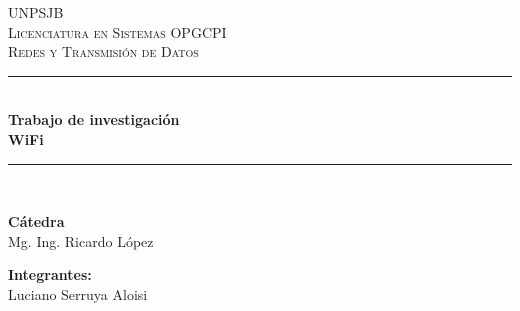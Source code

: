 \begin{titlepage}

    \newcommand{\HRule}{\rule{\linewidth}{0.5mm}} %

    \center %
     

    \textsc{\LARGE UNPSJB}\\[1cm] %
    \textsc{\Large Licenciatura en Sistemas OPGCPI}\\[0.5cm] %
    \textsc{\large Redes y Transmisión de Datos}\\[0.5cm] %


    \HRule \\[0.4cm]
    {\huge \bfseries Trabajo de investigación}\\[0.4cm] %
    {\large \bfseries WiFi}\\[0.4cm] %
    \HRule \\[1.5cm]
     


    \begin{minipage}[l]{0.5\textwidth}
        \begin{flushleft}
            \textbf{\textsf{Cátedra}}\\
            \large Mg. Ing. Ricardo López \\ 
            \linespread{4}
            \end{flushleft}
    \end{minipage}
    \begin{minipage}[l]{0.4\textwidth}
        \begin{flushright}
            \textbf{\textsf{Integrantes:}}\\
            \linespread{1}
            \large Luciano Serruya Aloisi\\
        \end{flushright}
    \end{minipage}\\[1.5cm]


\end{titlepage}
